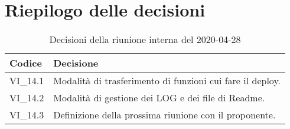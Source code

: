 \section{Riepilogo delle decisioni}
\begin{longtable}{ 
	 >{\centering}p{} >{}p{} }
	
	\caption{Decisioni della riunione interna del 2020-04-28}\\	
	
	\textbf{\color{white}Codice} & 
	\textbf{\color{white}Decisione} 
	\tabularnewline  
	\endhead
	
	VI\_14.1 & Modalità di trasferimento di funzioni cui fare il deploy. \\
	VI\_14.2 & Modalità di gestione dei LOG e dei file di Readme. \\
	VI\_14.3 & Definizione della prossima riunione con il proponente. \\
	

\end{longtable}